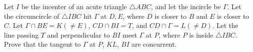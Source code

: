 Let $I$ be the incenter of an acute triangle $\triangle ABC$, and let the incircle be $\Gamma$.
Let the circumcircle of $\triangle IBC$ hit $\Gamma$ at $D, E$, where $D$ is closer to $B$ and $E$ is closer to $C$.
Let $\Gamma \cap BE = K (\not= E)$, $CD \cap BI = T$, and $CD \cap \Gamma = L (\not= D)$.
Let the line passing $T$ and perpendicular to $BI$ meet $\Gamma$ at $P$, where $P$ is inside $\triangle IBC$.
Prove that the tangent to $\Gamma$ at $P$, $KL$, $BI$ are concurrent.